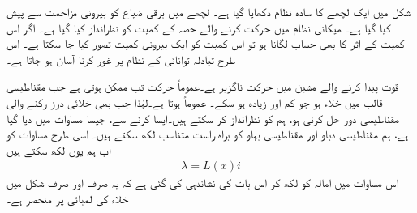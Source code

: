 شکل   میں  ایک لچھے کا سادہ نظام دکھایا گیا ہے۔ لچھے میں برقی ضیاع کو بیرونی مزاحمت سے پیش کیا گیا ہے۔ میکانی نظام میں حرکت کرنے والے حصہ کے کمیت کو نظرانداز کیا گیا ہے۔ اگر اس کمیت  کے اثر کا بھی حساب لگانا ہو تو اس کمیت کو ایک بیرونی کمیت تصور کیا جا سکتا ہے۔ اس طرح تبادلہ توانائی کے نظام پر غور کرنا آسان ہو جاتا ہے۔ 

قوت پیدا کرنے والے مشین میں حرکت ناگزیر ہے۔عموماً حرکت تب ممکن ہوتی ہے جب مقناطیسی قالب میں خلاء ہو جو کم اور زیادہ ہو سکے۔  عموماً  ہوتا ہے۔لہٰذا جب بھی خلائی درز رکنے والی  مقناطیسی دور حل کرنی ہو،  ہم  کو نظرانداز کر سکتے ہیں۔ایسا کرنے سے، جیسا مساوات   میں دیا گیا ہے، ہم  مقناطیسی دباو  اور مقناطیسی بہاو  کو براہ راست متناسب لکھ سکتے ہیں۔ اسی طرح مساوات    کو اب  ہم  یوں لکھ سکتے ہیں
\begin{align}\label{مساوات_تبادلہ_ارتباط_بہاو_اور_امالہ}
\lambda=L(x) i
\end{align}
اس مساوات میں امالہ  کو  لکھ کر اس بات کی نشاندہی کی گئی ہے کہ یہ صرف اور صرف  شکل    میں خلاء کی لمبائی  پر منحصر ہے۔

